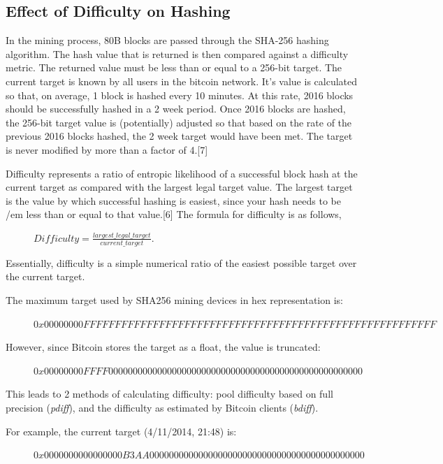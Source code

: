 \documentclass[pdftex,11pt]{article}
\begin{document}
\subsection{Effect of Difficulty on Hashing}
In the mining process, 80B blocks are passed through the SHA-256 hashing algorithm. The hash value that is returned is then compared against a difficulty metric. The returned value must be less than or equal to a 256-bit target. The current target is known by all users in the bitcoin network. It's value is calculated so that, on average, 1 block is hashed every 10 minutes. At this rate, 2016 blocks should be successfully hashed in a 2 week period. Once 2016 blocks are hashed, the 256-bit target value is (potentially) adjusted so that based on the rate of the previous 2016 blocks hashed, the 2 week target would have been met. The target is never modified by more than a factor of 4.[7]

Difficulty represents a ratio of entropic likelihood of a successful block hash at the current target as compared with the largest legal target value. The largest target is the value by which successful hashing is easiest, since your hash needs to be {/em less than or equal} to that value.[6] The formula for difficulty is as follows,
\begin{figure}[H]
	\centering
 	$Difficulty = \frac{largest\_legal\_target}{current\_target}$.
 \end{figure}


Essentially, difficulty is a simple numerical ratio of the easiest possible target over the current target.

The maximum target used by SHA256 mining devices in hex representation is:

\begin{figure}[H]
	\centering
 	$0x00000000FFFFFFFFFFFFFFFFFFFFFFFFFFFFFFFFFFFFFFFFFFFFFFFFFFFFFFFF$
 \end{figure}

However, since Bitcoin stores the target as a float, the value is truncated:
\begin{figure}[H]
	\centering
 	$0x00000000FFFF0000000000000000000000000000000000000000000000000000$
 \end{figure}

This leads to 2 methods of calculating difficulty: pool difficulty based on full precision ({\em pdiff}), and the difficulty as estimated by Bitcoin clients ({\em bdiff}).

For example, the current target (4/11/2014, 21:48) is: 
\begin{figure}[H]
	\centering
 	$0x0000000000000000B3AA00000000000000000000000000000000000000000000$
 \end{figure}
\end{document}
